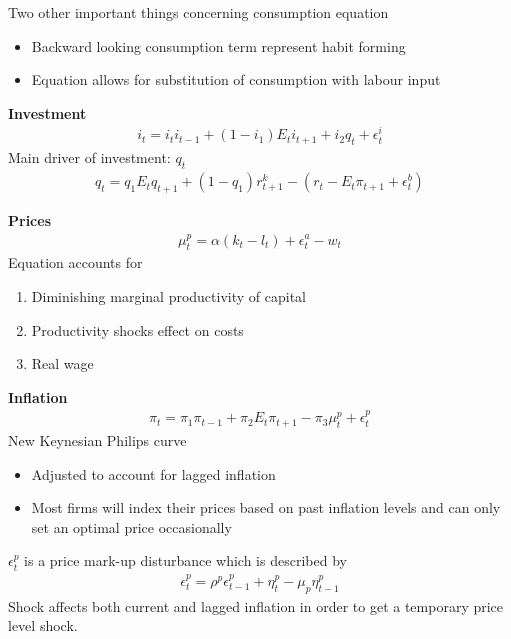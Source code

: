 \documentclass{beamer}
\begin{document}
\begin{frame}
  Two other important things concerning consumption equation
\begin{itemize}
  \item Backward looking consumption term represent habit forming
  \item Equation allows for substitution of consumption with labour input
\end{itemize}

\end{frame}

\begin{frame}
  \textbf{Investment}  
\begin{align}
  i_t = i_ti_{t-1} + (1-i_1)E_ti_{t+1} + i_2q_t + \epsilon_t^i
\end{align}
 Main driver of investment: $q_t$
\begin{align}
  q_t = q_1E_tq_{t+1} + (1-q_1)r_{t+1}^k - (r_t - E_t\pi_{t+1} + \epsilon_t^b)
\end{align}
\end{frame}

\begin{frame}
 \textbf{Prices}  
\begin{align}
  \mu_t^p = \alpha(k_t-l_t) + \epsilon_t^a - w_t
\end{align}
 Equation accounts for 
 \begin{enumerate}
   \item Diminishing marginal productivity of capital 
   \item Productivity shocks effect on costs
   \item Real wage
 \end{enumerate}
\end{frame}

\begin{frame}
  \textbf{Inflation}
\begin{align}
  \pi_t = \pi_1\pi_{t-1} +\pi_2 E_t\pi_{t+1} - \pi_3\mu_t^p + \epsilon_t^p
\end{align}
 New Keynesian Philips curve
 \begin{itemize}
   \item Adjusted to account for lagged inflation
   \item Most firms will index their prices based on past inflation levels and can only set an optimal price occasionally
 \end{itemize}
\medskip
$\epsilon_t^p$ is a price mark-up disturbance which is described by
\begin{align}
  \epsilon_t^p = \rho^p \epsilon^p_{t-1} + \eta_t^p - \mu_p\eta_{t-1}^p
\end{align}
\medskip
Shock affects both current and lagged inflation in order to get a temporary price level shock. 
\end{frame}
\end{document}
